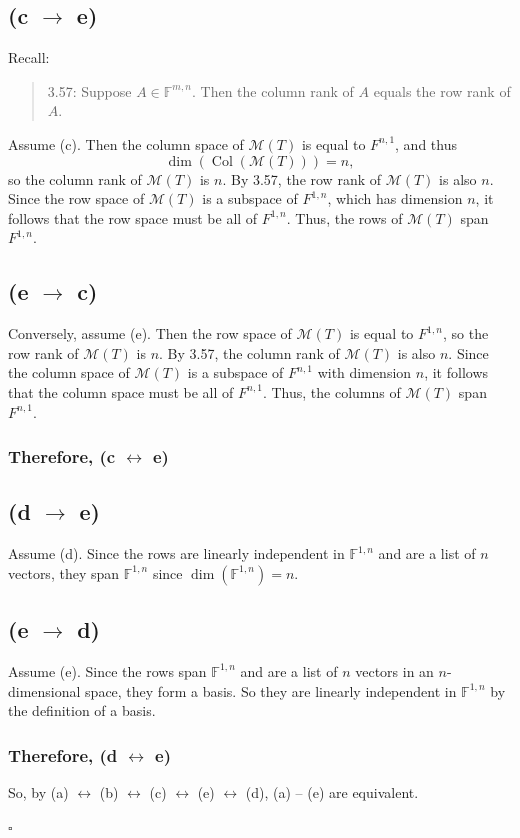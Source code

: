 \documentclass[11pt]{article}
\begin{document}
\begin{solutionBox}
\subsection*{(c $\to$ e)}
Recall:
\begin{quote}
3.57: Suppose $A\in \mathbb{F}^{m,n}$. Then the column rank of $A$ equals the row rank of $A$.
\end{quote}
Assume (c). Then the column space of $\mathcal{M}(T)$ is equal to $F^{n,1}$, and thus
\[
  \dim(\operatorname{Col}(\mathcal{M}(T))) = n,
\]
so the column rank of  $\mathcal{M}(T)$ is $n$. By 3.57, the row rank of $\mathcal{M}(T)$ is also $n$. Since the row space of $\mathcal{M}(T)$ is a subspace of $F^{1,n}$, which has dimension $n$, it follows that the row space must be all of $F^{1,n}$. Thus, the rows of $\mathcal{M}(T)$ span $F^{1,n}$.

\subsection*{(e $\to$ c)}
Conversely, assume (e). Then the row space of $\mathcal{M}(T)$ is equal to $F^{1,n}$, so the row rank of $\mathcal{M}(T)$ is $n$. By 3.57, the column rank of $\mathcal{M}(T)$ is also $n$. Since the column space of $\mathcal{M}(T)$ is a subspace of $F^{n,1}$ with dimension $n$, it follows that the column space must be all of $F^{n,1}$. Thus, the columns of $\mathcal{M}(T)$ span $F^{n,1}$.
\subsubsection*{Therefore, (c $\leftrightarrow$ e)}

\subsection*{(d $\to$ e)}
Assume (d). Since the rows are linearly independent in $\mathbb{F}^{1,n}$ and are a list of $n$ vectors, they span $\mathbb{F}^{1,n}$ since $\dim(\mathbb{F}^{1,n})=n$.

\subsection*{(e $\to$ d)}
Assume (e). Since the rows span $\mathbb{F}^{1,n}$ and are a list of $n$ vectors in an $n$-dimensional space, they form a basis. So they are linearly independent in $\mathbb{F}^{1,n}$ by the definition of a basis.

\subsubsection*{Therefore, (d $\leftrightarrow$ e)}

So, by (a) $\leftrightarrow$ (b) $\leftrightarrow$ (c) $\leftrightarrow$ (e) $\leftrightarrow$ (d), (a) -- (e) are equivalent.


\end{solutionBox}

\hfill \ensuremath{\square}
\end{document}
